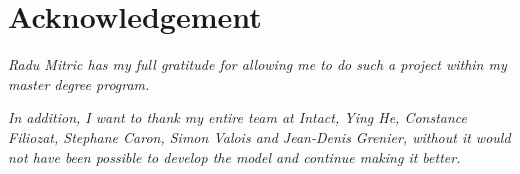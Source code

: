 \section*{Acknowledgement}
\begin{center}
	\vspace{8cm}
	
	\textit{Radu Mitric has my full gratitude for allowing me to do such a project within my master degree program.} \\
	\vspace{0.5cm}
	
	\textit{In addition, I want to thank my entire team at Intact, Ying He, Constance Filiozat, Stephane Caron, Simon Valois and Jean-Denis Grenier, without it would not have been possible to develop the model and continue making it better.}
\end{center}
